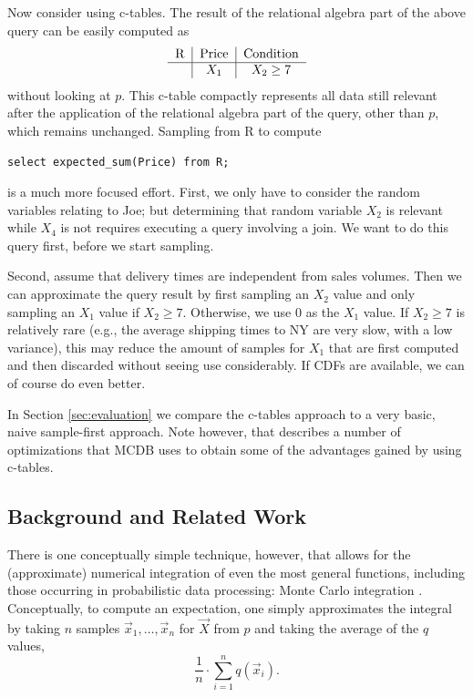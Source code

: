 \begin{example}
Now consider using c-tables. The result of the relational algebra part of the
above query can be easily computed as
\[
\begin{tabular}{c|c|c}
R & Price & Condition \\
\hline
& $X_1$ & $X_2 \ge 7$ \\
\end{tabular}
\]
without looking at $p$.
This c-table compactly represents all data still relevant after the
application of the relational algebra part of the query, other than $p$,
which remains unchanged.
Sampling from R to compute
\begin{verbatim}
select expected_sum(Price) from R;
\end{verbatim}
is a much more focused effort.
First, we only have to consider the random variables relating to Joe;
but determining that random variable $X_2$ is relevant while $X_4$
is not requires
executing a query involving a join. We want to do this query first, before
we start sampling.

Second, assume that delivery times are
independent from sales volumes. Then we can approximate the
query result
by first sampling an $X_2$ value and only sampling an $X_1$ value if $X_2 \ge 7$.
Otherwise, we use $0$ as the $X_1$ value.
If $X_2 \ge 7$ is relatively rare (e.g., the average shipping times to NY are
very slow, with a low variance), this may reduce the amount of samples
for $X_1$ that are first computed and then discarded without seeing use
considerably.
If CDFs are available, we can of course do even better.

In Section \ref{sec:evaluation} we compare the c-tables approach to a very basic, 
naive sample-first approach.  Note however, that \cite{MCDB} describes a number of 
optimizations that MCDB uses to obtain some of the advantages gained by using c-tables.
%
\punto
\end{example}

\subsection{Background and Related Work}
There is one conceptually simple technique, however, that  allows for the (approximate) numerical integration of even  the most general  functions, including those occurring in  probabilistic data  processing: Monte Carlo integration \cite{montecarlo}. Conceptually, to compute an expectation, one simply approximates   the  integral  by  taking $n$ samples $\vec{x}_1, \dots, \vec{x}_n$ for $\vec{X}$ from $p$  and  taking  the  average of the $q$ values,
%
\begin{equation}\label{eq:mc_expectation}
\frac{1}{n} \cdot \sum_{i=1}^n q(\vec{x}_i).
\end{equation}


